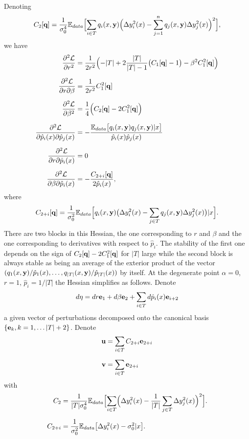 Denoting
\[
C_2[{\bf q}] = \frac{1}{\sigma_0^4}{\mathbb E}_{data}\Bigl[\sum_{i\in T} q_i(x,{\bf y})\Bigl(\Delta y_i^2(x)-\sum_{j=1}^n q_j(x,{\bf y})\Delta y_j^2(x)\Bigr)^2\Bigr],
\]
we have
\begin{align*}
\frac{\partial^2 {\cal L}}{\partial r^2} &= \frac{1}{2r^2}\Bigl(-{\vert T\vert} +2\frac{\vert T\vert}{\vert T\vert-1}\bigl(C_1[{\bf q}]-1\bigr)-\beta^2 C_1^2[{\bf q}]\Bigr)\\[0.2cm]
\frac{\partial^2 {\cal L}}{\partial r\partial \beta} &=\frac{1}{2r^2}C_1^2[{\bf q}]\\[0.2cm]
\frac{\partial^2 {\cal L}}{\partial \beta^2} &= \frac{1}{4}\Bigl(C_2[{\bf q}]-2C_1^2[{\bf q}]\Bigr)\\[0.2cm]
\frac{\partial^2 {\cal L}}{\partial \hat p_i(x)\partial\hat p_j(x)}  &= -\frac{{\mathbb E}_{data}\bigl[ q_i(x,{\bf y})q_j(x,{\bf y})\vert x \bigr]}{\hat p_i(x)\hat p_j(x)}\\[0.2cm]
\frac{\partial^2 {\cal L}}{\partial r\partial\hat p_i(x)} &= 0\\[0.2cm]
\frac{\partial^2 {\cal L}}{\partial \beta\partial\hat p_i(x)} &= -\frac{C_{2+i}[{\bf q}]}{2\hat p_i(x)},
\end{align*}
where
\[
C_{2+i}[{\bf q}] = \frac{1}{\sigma_0^2}{\mathbb E}_{data}
\Bigl[ q_i(x,{\bf y})\bigl(\Delta y_i^2(x)-\sum_{j\in T} q_j(x,{\bf y})\Delta y_j^2(x)\bigr)\vert x \Bigr].
\]
There are two blocks in this Hessian, the one corresponding to $r$ and $\beta$ and the one corresponding to derivatives with respect to $\hat p_i$.
The stability of the first one depends on the sign of $C_2[{\bf q}]-2C_1^2[{\bf q}]$ for $\vert T\vert$ large while the second block
is always stable as being an average of the exterior product of the vector $(q_1(x,{\bf y})/\hat p_1(x),\ldots,q_{\vert T\vert}(x,{\bf y})/\hat p_{\vert T\vert}(x))$
by itself. At the degenerate point $\alpha=0$, $r=1$, $\hat  p_i=1/\vert T\vert$ the Hessian simplifies as follows. Denote
\[
{d{\bf \eta}} = dr{\bf e}_1+d\beta{\bf e}_2+\sum_{i\in T} d\hat p_i(x){\bf e}_{i+2}
\]
a given vector of perturbations decomposed onto the canonical basis $\{{\bf e}_k,k=1,\ldots \vert T\vert+2\}$.
Denote
\begin{align*}
{\bf u} &= \sum_{i\in T} C_{2+i} {\bf e}_{2+i}\\[0.2cm]    
{\bf v} &= \sum_{i\in T}  {\bf e}_{2+i}
\end{align*}
with
\begin{align*}
C_2 &= \frac{1}{\vert T\vert\sigma_0^4}{\mathbb E}_{data}\Bigl[\sum_{i\in T} \Bigl(\Delta y_i^2(x)-\frac{1}{\vert T\vert}\sum_{j\in T}\Delta y_j^2(x)\Bigr)^2\Bigr].\\[0.2cm]
C_{2+i} &= \frac{1}{\sigma_0^2}{\mathbb E}_{data}
\bigl[\Delta y_i^2(x)-\sigma_0^2\vert x \bigr].
\end{align*}
